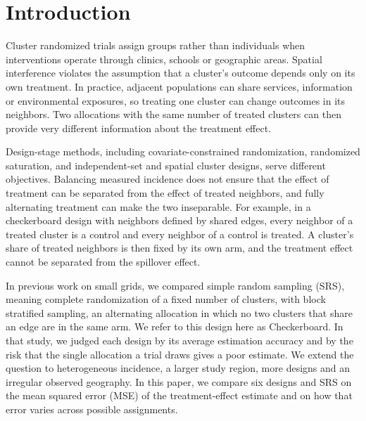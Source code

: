 \documentclass[Afour,sagev,times]{sagej}
\begin{document}
\section{Introduction}
Cluster randomized trials assign groups rather than individuals when interventions operate through clinics, schools or geographic areas.\cite{donner_design_2000,hayes_cluster_2017} Spatial interference violates the assumption that a cluster's outcome depends only on its own treatment. In practice, adjacent populations can share services, information or environmental exposures, so treating one cluster can change outcomes in its neighbors.\cite{hudgens_toward_2008,jarvis_spatial_2017} Two allocations with the same number of treated clusters can then provide very different information about the treatment effect.\cite{baird_optimal_2018,leung_rateoptimal_2022,walther_spatialcrt_2026}

Design-stage methods, including covariate-constrained randomization, randomized saturation, and independent-set and spatial cluster designs, serve different objectives.\cite{crisp_covariate-constrained_2023,baird_optimal_2018,cai_independentset_2023,leung_rateoptimal_2022} Balancing measured incidence does not ensure that the effect of treatment can be separated from the effect of treated neighbors, and fully alternating treatment can make the two inseparable. For example, in a checkerboard design with neighbors defined by shared edges, every neighbor of a treated cluster is a control and every neighbor of a control is treated. A cluster's share of treated neighbors is then fixed by its own arm, and the treatment effect cannot be separated from the spillover effect.\cite{walther_spatialcrt_2026}

In previous work on small grids, we compared simple random sampling (SRS), meaning complete randomization of a fixed number of clusters, with block stratified sampling, an alternating allocation in which no two clusters that share an edge are in the same arm.\cite{walther_spatialcrt_2026} We refer to this design here as Checkerboard. In that study, we judged each design by its average estimation accuracy and by the risk that the single allocation a trial draws gives a poor estimate. We extend the question to heterogeneous incidence, a larger study region, more designs and an irregular observed geography. In this paper, we compare six designs and SRS on the mean squared error (MSE) of the treatment-effect estimate and on how that error varies across possible assignments.
\end{document}

